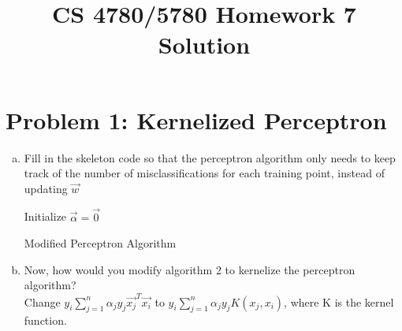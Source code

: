 \documentclass{article}
\title{CS 4780/5780 Homework 7 Solution}
\author{}
\date{}
\begin{document}
    \maketitle
	\section*{Problem 1: Kernelized Perceptron}
	\begin{comment}
		In this problem, we are going to kernelize the perceptron algorithm. Recall the perceptron algorithm
		
		\begin{algorithm}[H]
		\SetAlgoLined
		
		Initialize $\vec{w} = \vec{0}$ \;
		\While{TRUE}{
		m =  0 \;
		\For{$(x_i, y_i) \in D$}{
		\If{$y_i(\vec{w}^T\vec{x_i}) \leq 0$}{
		$\vec{w}\gets \vec{w} + y_i\vec{x_i}$\;
		$m\gets m + 1$\;
		}
		}
		\If{$m = 0$}{
		break
		}
		
		
		}
		\caption{Perceptron Algorithm}
		\end{algorithm}
		\noindent
		Now recall that in homework 2, we have shown that if we know the number of misclassifications for each training point, say $\alpha_i$ for $\vec{x}_i$, then we deduce that
		$$\vec{w} = \sum_{i=1}^{n} \alpha_i y_i \vec{x}_i$$ This observation allows us to modify the perceptron algorithm such that we only need to keep track the number of misclassifications for each training points, instead of updating $\vec{w}$.
	\end{comment}
	
	\begin{enumerate}[(a)]
		\item Fill in the skeleton code so that the perceptron algorithm only needs to keep track of the number of misclassifications for each training point, instead of updating $\vec{w}$ \\
		\begin{algorithm}[H]
			\SetAlgoLined

			Initialize $\vec{\alpha} = \vec{0}$ \;
			\caption{Modified Perceptron Algorithm}
		\end{algorithm}

		\item Now, how would you modify algorithm 2 to kernelize the perceptron algorithm?\\

		Change $y_i\sum_{j=1}^n\alpha_jy_j\vec{x_j}^T\vec{x_i}$ to $y_i\sum_{j=1}^n\alpha_jy_jK(x_j, x_i)$, where K is the kernel function.

	\end{enumerate}
\end{document}
